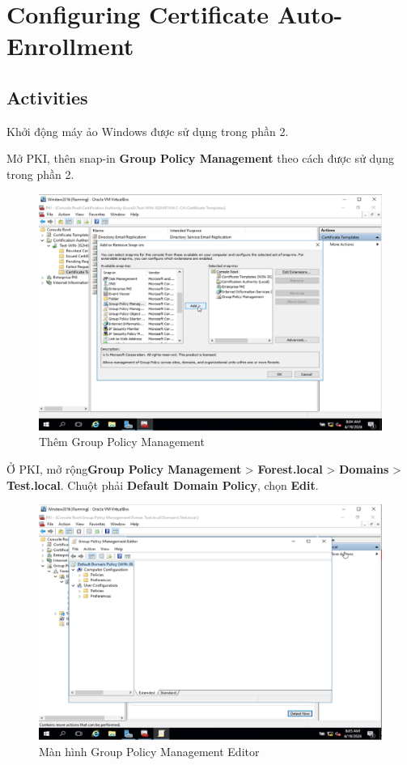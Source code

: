 \newpage
\section{Configuring Certificate Auto-Enrollment}
\subsection{Activities}

 Khởi động máy ảo Windows được sử dụng trong phần 2.

 Mở PKI, thên snap-in \textbf{Group Policy Management} theo cách được sử dụng trong phần 2.

\begin{figure}[!htb]
    \centering
    \includegraphics[width=0.7\linewidth]{figure//chapter4//lab4_3/add_group_policy_management.png}
    \caption{Thêm Group Policy Management}
    \label{fig:enter-label}
\end{figure}

 Ở PKI, mở rộng\textbf{Group Policy Management} > \textbf{Forest.local} > \textbf{Domains} > \textbf{Test.local}. Chuột phải \textbf{Default Domain Policy}, chọn \textbf{Edit}. 

\begin{figure}[!htb]
    \centering
    \includegraphics[width=0.8\linewidth]{figure//chapter4//lab4_3/gpm_editor.png}
    \caption{Màn hình Group Policy Management Editor}
    \label{fig:enter-label}
\end{figure}

